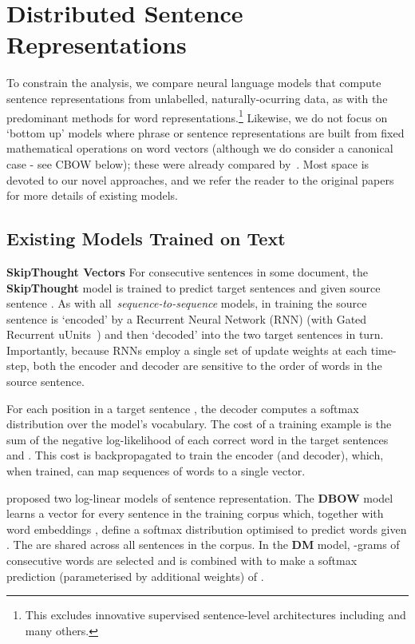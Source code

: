 \documentclass[11pt,letterpaper]{article}
\begin{document}
\section{Distributed Sentence Representations}

To constrain the analysis, we compare neural language models that compute sentence representations from unlabelled, naturally-ocurring data, as with the predominant methods for word representations.\footnote{This excludes innovative supervised sentence-level architectures including \cite{socher2011semi,kalchbrenner2014convolutional} and many others.} Likewise, we do not focus on `bottom up' models where phrase or sentence representations are built from fixed mathematical operations on word vectors (although we do consider a canonical case - see CBOW below); these were already compared by~. Most space is devoted to our novel approaches, and we refer the reader to the original papers for more details of existing models. 

\subsection{Existing Models Trained on Text}
{\bf SkipThought Vectors} For consecutive sentences  in some document, the {\bf SkipThought} model \cite{kiros2015skip} is trained to predict target sentences  and  given source sentence . As with all~\emph{sequence-to-sequence} models, in training the source sentence is `encoded' by a Recurrent Neural Network (RNN) (with Gated Recurrent uUnits~\cite{cho2014learning}) and then `decoded' into the two target sentences in turn. Importantly, because RNNs employ a single set of update weights at each time-step, both the encoder and decoder are sensitive to the order of words in the source sentence. 

For each position in a target sentence , the decoder computes a softmax distribution over the model's vocabulary. The cost of a training example is the sum of the negative log-likelihood of each correct word in the target sentences  and . This cost is backpropagated to train the encoder (and decoder), which, when trained, can map sequences of words to a single vector.

\vspace{5pt}  proposed two log-linear models of sentence representation. The {\bf DBOW} model learns a vector  for every sentence  in the training corpus which, together with word embeddings , define a softmax distribution optimised to predict words  given . The  are shared across all sentences in the corpus. In the {\bf DM} model, -grams of consecutive words  are selected and  is combined with  to make a softmax prediction (parameterised by additional weights) of . 
\end{document}
